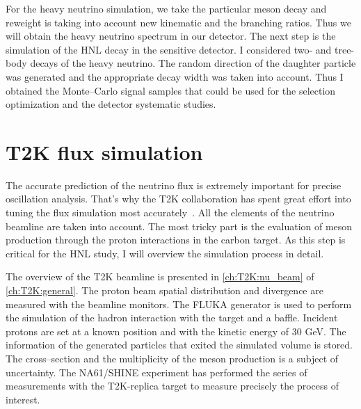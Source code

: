 \documentclass[../main.tex]{subfiles}
\begin{document}
For the heavy neutrino simulation, we take the particular meson decay and reweight is taking into account new kinematic and the branching ratios. Thus we will obtain the heavy neutrino spectrum in our detector. The next step is the simulation of the HNL decay in the sensitive detector. I considered two- and tree-body decays of the heavy neutrino. The random direction of the daughter particle was generated and the appropriate decay width was taken into account. Thus I obtained the Monte--Carlo signal samples that could be used for the selection optimization and the detector systematic studies.

\section{T2K flux simulation}
The accurate prediction of the neutrino flux is extremely important for precise oscillation analysis. That's why the T2K collaboration has spent great effort into tuning the flux simulation most accurately~\cite{Abe2013}. All the elements of the neutrino beamline are taken into account. The most tricky part is the evaluation of meson production through the proton interactions in the carbon target. As this step is critical for the HNL study, I will overview the simulation process in detail.

The overview of the T2K beamline is presented in \autoref{ch:T2K:nu_beam} of \autoref{ch:T2K:general}. The proton beam spatial distribution and divergence are measured with the beamline monitors. The FLUKA generator is used to perform the simulation of the hadron interaction with the target and a baffle. Incident protons are set at a known position and with the kinetic energy of 30 GeV. The information of the generated particles that exited the simulated volume is stored. The cross--section and the multiplicity of the meson production is a subject of uncertainty. The NA61/SHINE experiment has performed the series of measurements with the T2K-replica target to measure precisely the process of interest.
\end{document}

